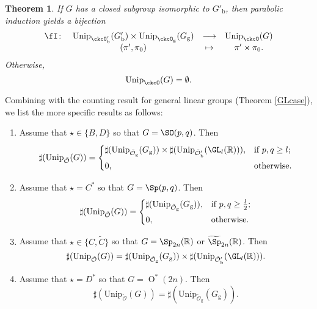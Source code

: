 \documentclass[12pt,a4paper]{amsart}
\newcommand{\CO}{{\mathcal {O}}}
\newcommand{\oO}{\operatorname{O}}
\newcommand{\R}{\mathbb R}
\numberwithin{equation}{section}
\newtheorem{thm}{Theorem}[section]
\theoremstyle{remark}
\def\Unip{\mathrm{Unip}}
\def\Gpb{G'_{\mathrm b}}
\begin{document}
\begin{thm}\label{reduction}
 If  $G$ has a closed subgroup isomorphic to $\Gpb$, then parabolic induction yields
   a bijection
   \[
    \begin{array}{rccc}
      \fI\colon &   \Unip_{\ckcO'_{\mathrm b}}( G'_{\mathrm b})\times \Unip_{\ckcO_{\mathrm g}}( G_{\mathrm g})&         \longrightarrow &\Unip_{\ckcO }(G) \\
                &   (\pi',\pi_{0}) & \mapsto & \pi'\rtimes \pi_{0}.
    \end{array}
 \]
  Otherwise,
  \[
    \Unip_{\ckcO}(G)=\emptyset.
  \]
\end{thm}


Combining with the counting result for general linear groups (Theorem \ref{GLcase}), we list the more specific results as follows:
\begin{enumerate}[label=(\alph*)]
  \item Assume that $\star\in \{B,D\}$ so that $G=\SO(p,q)$. Then
        \[
        \sharp(\Unip_{\check \CO}(G))=
        \begin{cases}
          \sharp(\Unip_{\check \CO_{\mathrm g}}(G_{\mathrm g}))\times \sharp(\Unip_{\check \CO'_{\mathrm b}}(\GL_l(\R)) ), &\hbox{if $p,q\geq l$}; \smallskip\\
          0, &\hbox{otherwise.}
        \end{cases}
        \]
  \item Assume that $\star=C^*$ so that $G=\Sp(p,q)$. Then
        \[
        \sharp(\Unip_{\check \CO}(G))=
        \begin{cases}
          \sharp(\Unip_{\check \CO_{\mathrm g}}(G_{\mathrm g} )), &\hbox{if $p,q\geq \frac{l}{2}$}; \smallskip\\
          0, &\hbox{otherwise.}
        \end{cases}
        \]

  \item Assume that $\star\in \{C,\widetilde C\}$ so that $G=\Sp_{2n}(\R)$ or
        $\widetilde \Sp_{2n}(\R)$. Then
        \[
        \sharp(\Unip_{\check \CO}(G))= \sharp(\Unip_{\check \CO_{\mathrm g}}(G_{\mathrm g}))\times \sharp(\Unip_{\check \CO'_{\mathrm b}}(\GL_l(\R)) ). \]
  \item Assume that $\star =D^*$ so that $G=\oO^*(2n)$. Then
        \[
          \sharp(\Unip_{\check \CO}(G))= \sharp(\Unip_{\check \CO_{\mathrm g}}(G_{\mathrm g})).
        \]
\end{enumerate}
\end{document}
